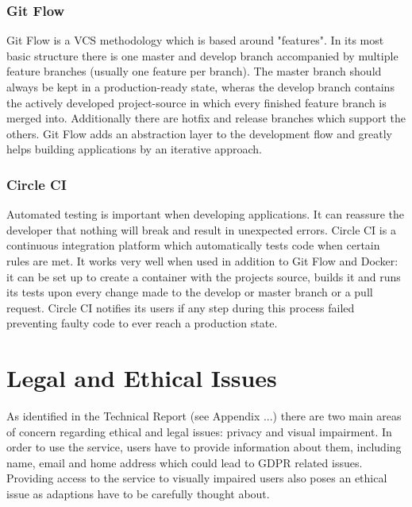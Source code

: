 \subsubsection{Git Flow}
Git Flow is a VCS methodology which is based around "features". In its most basic structure there is one master and develop branch accompanied by multiple feature branches (usually one feature per branch). The master branch should always be kept in a production-ready state, wheras the develop branch contains the actively developed project-source in which every finished feature branch is merged into. Additionally there are hotfix and release branches which support the others. Git Flow adds an abstraction layer to the development flow and greatly helps building applications by an iterative approach.

\subsubsection{Circle CI}
Automated testing is important when developing applications. It can reassure the developer that nothing will break and result in unexpected errors. Circle CI is a continuous integration platform which automatically tests code when certain rules are met. It works very well when used in addition to Git Flow and Docker: it can be set up to create a container with the projects source, builds it and runs its tests upon every change made to the develop or master branch or a pull request. Circle CI notifies its users if any step during this process failed preventing faulty code to ever reach a production state.

\section{Legal and Ethical Issues}
As identified in the Technical Report (see Appendix ...) there are two main areas of concern regarding ethical and legal issues: privacy and visual impairment. In order to use the service, users have to provide information about them, including name, email and home address which could lead to GDPR related issues. Providing access to the service to visually impaired users also poses an ethical issue as adaptions have to be carefully thought about.